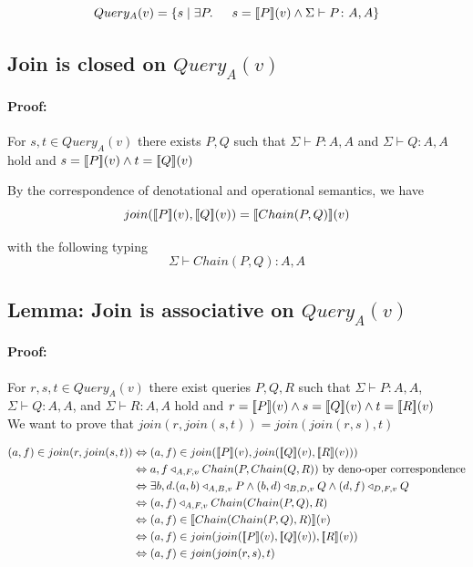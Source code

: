 \documentclass[12pt,a4paper,twoside,openright]{report}
\newcommand{\db}[1]{{\bf [\![}#1{\bf ]\!]}}
\newcommand{\deno}[1]{\db{#1}(v)}
\newcommand{\setComp}[2]{\left\lbrace #1 \mid #2 \right\rbrace}
\newcommand{\typeRule}[2]{\Sigma\vdash #1 \colon #2}
\newcommand{\denoRule}[2]{#1 \in \deno{#2}}
\newcommand{\opRule}[3]{#1 \triangleleft_{#2, v} #3}
\newcommand{\queryT}[1]{Query_{#1}(v)}
\let\oldparagraph\paragraph
\renewcommand{\paragraph}[1]{\oldparagraph{#1}\mbox{}}
\begin{document}
\begin{equation}
	\queryT{A} = \setComp{s}{\exists P.\indent s = \deno{P} \wedge \typeRule{P}{A, A}}
\end{equation}

\subsection{Join is closed on $\queryT{A}$}
\paragraph{Proof:}For $s, t \in \queryT{A}$ there exists $P, Q$ such that $\typeRule{P}{A, A}$ and $\typeRule{Q}{A, A}$ hold and $s = \deno{P} \wedge t = \deno{Q}$

By the correspondence of denotational and operational semantics, we have
	\begin{equation}
		join(\deno{P}, \deno{Q}) = \deno{Chain(P, Q)}
	\end{equation}
	
	with the following typing
	\begin{equation}
	\typeRule{Chain(P, Q)}{A, A}
	\end{equation}
	 
\subsection{Lemma: Join is associative on $\queryT{A}$}
\paragraph{Proof:} For $r, s, t \in \queryT{A}$ there exist queries $P, Q, R$ such that $\typeRule{P}{A, A}$, $\typeRule{Q}{A, A}$, and $\typeRule{R}{A, A}$  hold and $r = \deno{P} \wedge s = \deno{Q} \wedge t = \deno{R}$
\\We want to prove that $join(r, join(s, t)) = join(join(r, s), t)$

\begin{equation}\label{Well typed}
\begin{split}
(a, f) \in join(r, join(s, t)) & \Leftrightarrow (a, f) \in join(\deno{P}, join(\deno{Q},\deno{R}))\\
							  & \Leftrightarrow \opRule{a,f}{A, F}{Chain(P, Chain(Q, R))} \mbox{ by deno-oper correspondence}\\
							& \Leftrightarrow \exists b, d. \opRule{(a, b)}{A, B}{P} \wedge \opRule{(b,d)}{B,D}{Q} \wedge \opRule{(d,f)}{D,F}{Q}\\
							& \Leftrightarrow \opRule{(a, f)}{A, F}{Chain(Chain(P, Q), R)}\\
							& \Leftrightarrow \denoRule{(a, f)}{Chain(Chain(P, Q), R)}\\
							& \Leftrightarrow (a, f) \in join(join(\deno{P}, \deno{Q}), \deno{R})\\
							& \Leftrightarrow (a, f) \in join(join(r, s), t)\\							
\end{split}
\end{equation}
\end{document}
